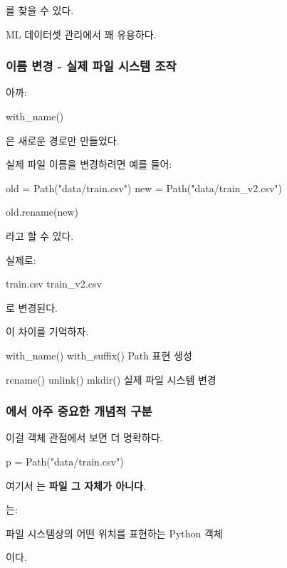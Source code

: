 를 찾을 수 있다.

ML 데이터셋 관리에서 꽤 유용하다.

\subsubsection{이름 변경 - 실제 파일 시스템 조작}

아까:

\begin{dhkcode}
with_name()
\end{dhkcode}

은 새로운 경로만 만들었다.

실제 파일 이름을 변경하려면 예를 들어:

\begin{dhkcode}
old = Path("data/train.csv")
new = Path("data/train_v2.csv")

old.rename(new)
\end{dhkcode}

라고 할 수 있다.

실제로:

\begin{dhksmry}[centered]
train.csv \ra train_v2.csv
\end{dhksmry}

로 변경된다.

이 차이를 기억하자.

\begin{dhksmry}[centered]
with_name()
with_suffix()
\da
Path 표현 생성

rename()
unlink()
mkdir()
\da
실제 파일 시스템 변경
\end{dhksmry}

\subsubsection{에서 아주 중요한 개념적 구분}

이걸 객체 관점에서 보면 더 명확하다.

\begin{dhkcode}
p = Path("data/train.csv")
\end{dhkcode}

여기서 는 \textbf{파일 그 자체가 아니다}.

는:

\begin{dhksmry}[centered]
파일 시스템상의 어떤 위치를 표현하는 Python 객체
\end{dhksmry}

이다.

